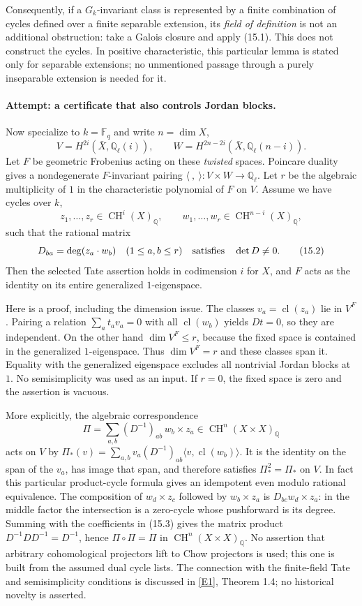\documentclass[11pt,a4paper]{article}
\newcommand{\Q}{\mathbb{Q}}
\newcommand{\F}{\mathbb{F}}
\newcommand{\eref}[2]{\hyperlink{extra:#1:#2}{[E#2]}}
\begin{document}
Consequently, if a $G_k$-invariant class is represented by a finite
combination of cycles defined over a finite separable extension, its
\emph{field of definition} is not an additional obstruction: take a
Galois closure and apply (15.1). This does not construct the cycles.
In positive characteristic, this particular lemma is stated only for
separable extensions; no unmentioned passage through a purely inseparable
extension is needed for it.

\paragraph{Attempt: a certificate that also controls Jordan blocks.}
Now specialize to $k=\F_q$ and write $n=\dim X$,
\[
 V=H^{2i}(\bar X,\Q_\ell(i)),\qquad
 W=H^{2n-2i}(\bar X,\Q_\ell(n-i)).
\]
Let $F$ be geometric Frobenius acting on these \emph{twisted} spaces.
Poincare duality gives a nondegenerate $F$-invariant pairing
$\langle\ ,\ \rangle:V\times W\to\Q_\ell$.
Let $r$ be the algebraic multiplicity of $1$ in the characteristic
polynomial of $F$ on $V$. Assume we have cycles over $k$,
\[
 z_1,\ldots,z_r\in\operatorname{CH}^i(X)_{\Q},\qquad
 w_1,\ldots,w_r\in\operatorname{CH}^{n-i}(X)_{\Q},
\]
such that the rational matrix
\[
 D_{ba}=\deg(z_a\cdot w_b)\quad(1\leq a,b\leq r)
 \quad\hbox{satisfies}\quad\det D\ne0. \tag{15.2}
\]
Then the selected Tate assertion holds in codimension $i$ for $X$,
and $F$ acts as the identity on its entire generalized $1$-eigenspace.

Here is a proof, including the dimension issue. The classes
$v_a=\operatorname{cl}(z_a)$ lie in $V^F$. Pairing a relation
$\sum_a t_av_a=0$ with all $\operatorname{cl}(w_b)$ yields $Dt=0$,
so they are independent. On the other hand
$\dim V^F\leq r$, because the fixed space is contained in the generalized
$1$-eigenspace. Thus $\dim V^F=r$ and these classes span it.
Equality with the generalized eigenspace excludes all nontrivial Jordan
blocks at $1$. No semisimplicity was used as an input. If $r=0$,
the fixed space is zero and the assertion is vacuous.

More explicitly, the algebraic correspondence
\[
 \Pi=\sum_{a,b}(D^{-1})_{ab}\,w_b\times z_a
       \in\operatorname{CH}^n(X\times X)_{\Q} \tag{15.3}
\]
acts on $V$ by
$\Pi_*(v)=\sum_{a,b}v_a(D^{-1})_{ab}\langle v,\operatorname{cl}(w_b)\rangle$.
It is the identity on the span of the $v_a$, has image that span, and
therefore satisfies $\Pi_*^2=\Pi_*$ on $V$. In fact this particular
product-cycle formula gives an idempotent even modulo rational
equivalence. The composition of $w_d\times z_c$ followed by
$w_b\times z_a$ is $D_{bc}w_d\times z_a$: in the middle factor the
intersection is a zero-cycle whose pushforward is its degree. Summing
with the coefficients in (15.3) gives the matrix product
$D^{-1}DD^{-1}=D^{-1}$, hence $\Pi\circ\Pi=\Pi$ in
$\operatorname{CH}^n(X\times X)_{\Q}$. No assertion that arbitrary
cohomological projectors lift to Chow projectors is used; this one is
built from the assumed dual cycle lists. The connection with the
finite-field Tate and semisimplicity conditions is discussed in
\eref{statement}{1}, Theorem 1.4; no historical novelty is asserted.
\end{document}
